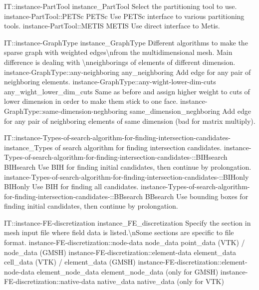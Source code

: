 \begin{SelectionType}
	{IT::instance-PartTool}
	{instance{\_}PartTool}
	{{{Select the partitioning tool to use.}%
}}
		\SelectionItem
			{instance-PartTool::PETSc}
			{PETSc}
			{{{Use PETSc interface to various partitioning tools.}%
}}
		\SelectionItem
			{instance-PartTool::METIS}
			{METIS}
			{{{Use direct interface to Metis.}%
}}
\end{SelectionType}
\begin{SelectionType}
	{IT::instance-GraphType}
	{instance{\_}GraphType}
	{{{Different algorithms to make the sparse graph with weighted edges{\textbackslash}nfrom the multidimensional mesh.
Main difference is dealing with {\textbackslash}nneighborings of elements of different dimension.}%
}}
		\SelectionItem
			{instance-GraphType::any-neighboring}
			{any{\_}neighboring}
			{{{Add edge for any pair of neighboring elements.}%
}}
		\SelectionItem
			{instance-GraphType::any-wight-lower-dim-cuts}
			{any{\_}wight{\_}lower{\_}dim{\_}cuts}
			{{{Same as before and assign higher weight to cuts of lower dimension in order to make them stick to one face.}%
}}
		\SelectionItem
			{instance-GraphType::same-dimension-neghboring}
			{same{\_}dimension{\_}neghboring}
			{{{Add edge for any pair of neighboring elements of same dimension (bad for matrix multiply).}%
}}
\end{SelectionType}
\begin{SelectionType}
	{IT::instance-Types-of-search-algorithm-for-finding-intersection-candidates-}
	{instance{\_}Types of search algorithm for finding intersection candidates.}
	{}
		\SelectionItem
			{instance-Types-of-search-algorithm-for-finding-intersection-candidates-::BIHsearch}
			{BIHsearch}
			{{{Use BIH for finding initial candidates, then continue by prolongation.}%
}}
		\SelectionItem
			{instance-Types-of-search-algorithm-for-finding-intersection-candidates-::BIHonly}
			{BIHonly}
			{{{Use BIH for finding all candidates.}%
}}
		\SelectionItem
			{instance-Types-of-search-algorithm-for-finding-intersection-candidates-::BBsearch}
			{BBsearch}
			{{{Use bounding boxes for finding initial candidates, then continue by prolongation.}%
}}
\end{SelectionType}
\begin{SelectionType}
	{IT::instance-FE-discretization}
	{instance{\_}FE{\_}discretization}
	{{{Specify the section in mesh input file where field data is listed.{\textbackslash}nSome sections are specific to file format.}%
}}
		\SelectionItem
			{instance-FE-discretization::node-data}
			{node{\_}data}
			{{{point{\_}data (VTK) / node{\_}data (GMSH)}%
}}
		\SelectionItem
			{instance-FE-discretization::element-data}
			{element{\_}data}
			{{{cell{\_}data (VTK) / element{\_}data (GMSH)}%
}}
		\SelectionItem
			{instance-FE-discretization::element-node-data}
			{element{\_}node{\_}data}
			{{{element{\_}node{\_}data (only for GMSH)}%
}}
		\SelectionItem
			{instance-FE-discretization::native-data}
			{native{\_}data}
			{{{native{\_}data (only for VTK)}%
}}
\end{SelectionType}
